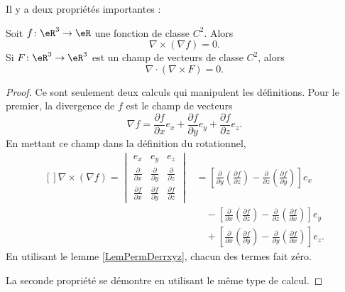Il y a deux propriétés importantes :
\begin{theorem}
    Soit $f\colon \eR^3\to \eR$ une fonction de classe $C^2$. Alors
    \begin{equation}
        \nabla\times(\nabla f)=0.
    \end{equation}
    Si $F\colon \eR^3\to \eR^3$ est un champ de vecteurs de classe $C^2$, alors
    \begin{equation}
        \nabla\cdot(\nabla\times F)=0.
    \end{equation}
\end{theorem}

\begin{proof}
    Ce sont seulement deux calculs qui manipulent les définitions. Pour le premier, la divergence de $f$ est le champ de vecteurs
    \begin{equation}
        \nabla f=\frac{ \partial f }{ \partial x }e_x+\frac{ \partial f }{ \partial y }e_y+\frac{ \partial f }{ \partial z }e_z.
    \end{equation}
    En mettant ce champ dans la définition du rotationnel,
    \begin{equation}
        \begin{aligned}[]
            \nabla\times(\nabla f)=\begin{vmatrix}
                 e_x   &   e_y    &   e_z    \\
                 \frac{ \partial  }{ \partial x }    &   \frac{ \partial  }{ \partial y }    &   \frac{ \partial  }{ \partial z }    \\
                 \frac{ \partial f }{ \partial x }    &   \frac{ \partial f }{ \partial y }    &   \frac{ \partial f }{ \partial z }
            \end{vmatrix}
            &=\left[ \frac{ \partial  }{ \partial y }\left( \frac{ \partial f }{ \partial z } \right)-\frac{ \partial  }{ \partial z }\left( \frac{ \partial f }{ \partial y } \right) \right]e_x\\
            &\quad-\left[ \frac{ \partial  }{ \partial x }\left( \frac{ \partial f }{ \partial z } \right)-\frac{ \partial  }{ \partial z }\left( \frac{ \partial f }{ \partial x } \right) \right]e_y\\
            &\quad+\left[ \frac{ \partial  }{ \partial x }\left( \frac{ \partial f }{ \partial y } \right)-\frac{ \partial  }{ \partial y }\left( \frac{ \partial f }{ \partial x } \right) \right]e_z.
        \end{aligned}
    \end{equation}
    En utilisant le lemme \ref{LemPermDerrxyz}, chacun des termes fait zéro.

    La seconde propriété se démontre en utilisant le même type de calcul.
\end{proof}


